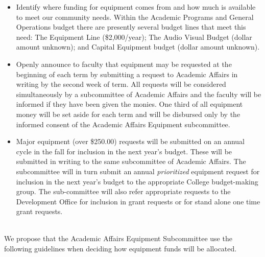

\begin{itemize}
\item  Identify where funding for equipment comes from and how much
is available to meet our community needs.  Within the Academic
Programs and General Operations budget there are presently
several budget lines that meet this need:  The Equipment Line
(\$2,000/year); The Audio Visual Budget (dollar amount unknown); and
Capital Equipment budget (dollar amount unknown). 

\item Openly announce to faculty that equipment may be requested at the
beginning of each term by submitting a request to Academic Affairs in
writing by the second week of term.  All requests will be considered
simultaneously by a subcommittee of Academic Affairs and the faculty
will be informed if they have been given the monies.  One third of all
equipment money will be set aside for each term and will be disbursed
only by the informed consent of the Academic Affairs Equipment subcommittee.
          

\item Major equipment (over \$250.00) requests will be submitted on an
annual cycle in the fall for inclusion in the next year's budget.  These will
be submitted in writing to the same subcommittee of Academic Affairs.
The subcommittee will in turn submit an annual {\em prioritized}\/
equipment request for inclusion in the next year's budget to the
appropriate College budget-making group.  The sub-committee will also
refer appropriate requests to the Development Office for inclusion in
grant requests or for stand alone one time grant requests. \\

\end{itemize}

 \\

We propose that the Academic Affairs Equipment Subcommittee use the
following guidelines when deciding how equipment funds will be
allocated. 

